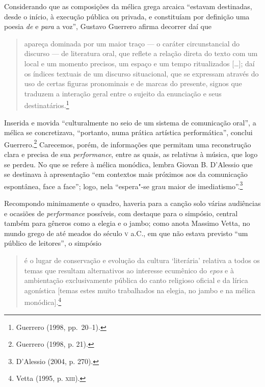 Considerando que as composições da mélica grega arcaica “estavam destinadas,
desde o início, à execução pública ou privada, e constituíam por definição uma
poesia \textit{de} e \textit{para} a voz”, Gustavo Guerrero
afirma decorrer daí que

\begin{quote}
apareça dominada por um maior traço --- o caráter circunstancial do discurso --- de
literatura oral, que reflete a relação direta do texto com um local e um
momento precisos, um espaço e um tempo ritualizados [\ldots{}]; daí os índices
textuais de um discurso situacional, que se expressam através do uso de certas
figuras pronominais e de marcas do presente, signos que traduzem a interação
geral entre o sujeito da enunciação e seus destinatários.\footnote{ Guerrero (1998, pp.~20--1).}
\end{quote}

Inserida e movida “culturalmente no seio de um sistema de comunicação oral”, a
mélica se concretizava, “portanto, numa prática artística performática”,
conclui Guerrero.\footnote{ Guerrero (1998, p. 21).} Carecemos, porém, de informações que permitam uma
reconstrução clara e precisa de sua \textit{performance}, entre as quais, as
relativas à música, que logo se perdeu. No que se refere à mélica monódica,
lembra Giovan B. D’Alessio que se destinava à apresentação “em
contextos mais próximos aos da comunicação espontânea, face a face”; logo, nela
“espera"-se grau maior de imediatismo”.\footnote{ D’Alessio (2004, p. 270).} 

Recompondo minimamente o quadro, haveria para a canção solo várias audiências e
ocasiões de \textit{performance} possíveis, com destaque para o simpósio,
central também para gêneros como a elegia e o jambo; como anota Massimo Vetta,
no mundo grego de até meados do século \textsc{v} a.C., em que não
estava previsto “um público de leitores”, o simpósio 

\begin{quote}
é o lugar de conservação
e evolução da cultura ‘literária’ relativa a todos os temas que resultam
alternativos ao interesse ecumênico do \textit{epos} e à ambientação
exclusivamente pública do canto religioso oficial e da lírica agonística
[temas estes muito trabalhados na elegia, no jambo e na mélica monódica].\footnote{ Vetta (1995, p. \textsc{xiii}).}
\end{quote}


